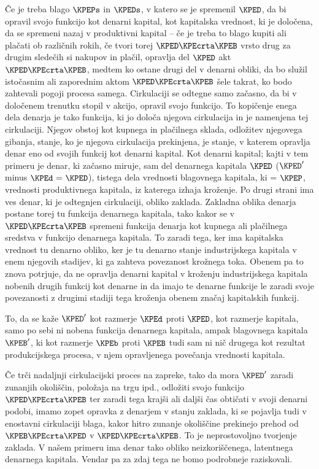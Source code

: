 \documentclass[kapital_02.tex]{subfiles}
\begin{document}
Če je treba blago \( \KPEPs \) in \( \KPEDs \), v katero se je spremenil \( \KPED \), da bi opravil svojo funkcijo kot denarni kapital, kot kapitalska vrednost, ki je določena, da se spremeni nazaj v produktivni kapital -- če je treba to blago kupiti ali plačati ob različnih rokih, če tvori torej \( \KPED \KPEcrta \KPEB \) vrsto drug za drugim sledečih si nakupov in plačil, opravlja del \( \KPED \) akt \( \KPED \KPEcrta \KPEB \), medtem ko ostane drugi del v denarni obliki, da bo služil istočasnim ali zaporednim aktom \( \KPED \KPEcrta \KPEB \) šele takrat, ko bodo zahtevali pogoji procesa samega. Cirkulaciji se odtegne samo začasno, da bi v določenem trenutku stopil v akcijo, opravil svojo funkcijo. To kopičenje enega dela denarja je tako funkcija, ki jo določa njegova cirkulacija in je namenjena tej cirkulaciji. Njegov obstoj kot kupnega in plačilnega sklada, odložitev njegovega gibanja, stanje, ko je njegova cirkulacija prekinjena, je stanje, v katerem opravlja denar eno od svojih funkcij kot denarni kapital. Kot denarni kapital; kajti v tem primeru je denar, ki začasno miruje, sam del denarnega kapitala \( \KPED \) (\( \KPED' \) minus \( \KPEd \textrm{ = } \KPED \)), tistega dela vrednosti blagovnega kapitala, ki = \( \KPEP \), vrednosti produktivnega kapitala, iz katerega izhaja kroženje. Po drugi strani ima ves denar, ki je odtegnjen cirkulaciji, obliko \KPEstran zaklada. Zakladna oblika denarja postane torej tu funkcija denarnega kapitala, tako kakor se v \( \KPED \KPEcrta \KPEB \) spremeni funkcija denarja kot kupnega ali plačilnega sredstva v funkcijo denarnega kapitala. To zaradi tega, ker ima kapitalska vrednost tu denarno obliko, ker je tu denarno stanje industrijskega kapitala v enem njegovih stadijev, ki ga zahteva povezanost krožnega toka. Obenem pa to znova potrjuje, da ne opravlja denarni kapital v kroženju industrijskega kapitala nobenih drugih funkcij kot denarne in da imajo te denarne funkcije le zaradi svoje povezanosti z drugimi stadiji tega kroženja obenem značaj kapitalskih funkcij.

To, da se kaže \( \KPED' \) kot razmerje \( \KPEd \) proti \( \KPED \), kot razmerje kapitala, samo po sebi ni nobena funkcija denarnega kapitala, ampak blagovnega kapitala \( \KPEB' \), ki kot razmerje \( \KPEb \) proti \( \KPEB \) tudi sam ni nič drugega kot rezultat produkcijskega procesa, v njem opravljenega povečanja vrednosti kapitala.

Če trči nadaljnji cirkulacijski proces na zapreke, tako da mora \( \KPED' \) zaradi zunanjih okoliščin, položaja na trgu ipd., odložiti svojo funkcijo \( \KPED \KPEcrta \KPEB \) ter zaradi tega krajši ali daljši čas obtičati v svoji denarni podobi, imamo zopet opravka z denarjem v stanju zaklada, ki se pojavlja tudi v enostavni cirkulaciji blaga, kakor hitro zunanje okoliščine prekinejo prehod od \( \KPEB \KPEcrta \KPED \) v \( \KPED \KPEcrta \KPEB \). To je neprostovoljno tvorjenje zaklada. V našem primeru ima denar tako obliko neizkoriščenega, latentnega denarnega kapitala. Vendar pa za zdaj tega ne bomo podrobneje raziskovali.
\end{document}
